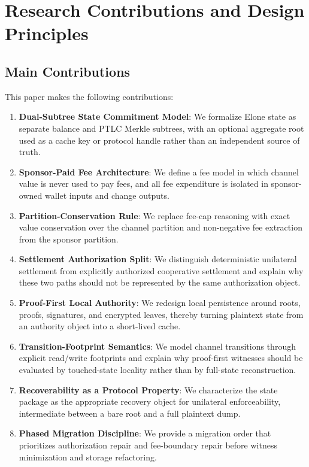 \documentclass[11pt,a4paper]{article}
\begin{document}
\section{Research Contributions and Design Principles}

\subsection{Main Contributions}

This paper makes the following contributions:
\begin{enumerate}
    \item \textbf{Dual-Subtree State Commitment Model}: We formalize Elone state as separate balance and PTLC Merkle subtrees, with an optional aggregate root used as a cache key or protocol handle rather than an independent source of truth.
    \item \textbf{Sponsor-Paid Fee Architecture}: We define a fee model in which channel value is never used to pay fees, and all fee expenditure is isolated in sponsor-owned wallet inputs and change outputs.
    \item \textbf{Partition-Conservation Rule}: We replace fee-cap reasoning with exact value conservation over the channel partition and non-negative fee extraction from the sponsor partition.
    \item \textbf{Settlement Authorization Split}: We distinguish deterministic unilateral settlement from explicitly authorized cooperative settlement and explain why these two paths should not be represented by the same authorization object.
    \item \textbf{Proof-First Local Authority}: We redesign local persistence around roots, proofs, signatures, and encrypted leaves, thereby turning plaintext state from an authority object into a short-lived cache.
    \item \textbf{Transition-Footprint Semantics}: We model channel transitions through explicit read/write footprints and explain why proof-first witnesses should be evaluated by touched-state locality rather than by full-state reconstruction.
    \item \textbf{Recoverability as a Protocol Property}: We characterize the state package as the appropriate recovery object for unilateral enforceability, intermediate between a bare root and a full plaintext dump.
    \item \textbf{Phased Migration Discipline}: We provide a migration order that prioritizes authorization repair and fee-boundary repair before witness minimization and storage refactoring.
\end{enumerate}
\end{document}

